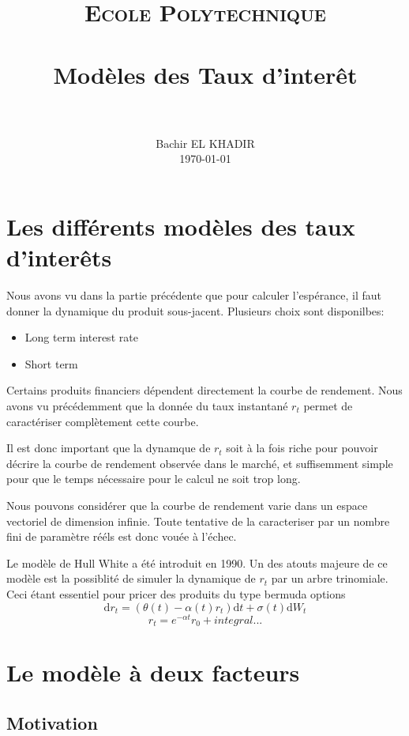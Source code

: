 \documentclass[paper=a4, fontsize=11pt]{scrartcl}
\title{
		\usefont{OT1}{bch}{b}{n}
		\normalfont \normalsize \textsc{Ecole Polytechnique} \\ [25pt]
		\horrule{0.5pt} \\[0.4cm]
		\huge Modèles des Taux d'interêt \\
		\horrule{2pt} \\[0.5cm]
}
\author{
		\normalfont \normalsize
                Bachir EL KHADIR\\[-3pt] \normalsize
                \today	
}
\date{}
\numberwithin{equation}{section}		%
\numberwithin{figure}{section}			%
\numberwithin{table}{section}				%
\theoremstyle{definition}
\begin{document}
\maketitle

\newpage
\tableofcontents

\newpage

\newpage
 
\newpage
 
\newpage
\section{Les différents modèles des taux d'interêts}

Nous avons vu dans la partie précédente que pour calculer l'espérance, il faut donner la dynamique du produit sous-jacent.
Plusieurs choix sont disponilbes:
\begin{itemize}
\item Long term interest rate
\item Short term
\end{itemize}

Certains produits financiers dépendent directement la courbe de rendement. Nous avons vu précédemment que la donnée du taux instantané $r_t$ permet de caractériser complètement cette courbe. 

Il est donc important que la dynamque de $r_t$ soit à la fois riche pour pouvoir décrire la courbe de rendement observée dans le marché, et suffisemment simple pour que le temps nécessaire pour le calcul ne soit trop long.

Nous pouvons considérer que la courbe de rendement varie dans un espace vectoriel de dimension infinie. Toute tentative de la caracteriser par un nombre fini de paramètre rééls est donc vouée à l'échec.

Le modèle de Hull White a été introduit en 1990.  Un des atouts majeure de ce modèle est la possiblité de simuler la dynamique de $r_t$ par un arbre trinomiale. Ceci étant essentiel pour pricer des produits du type bermuda options
$$ \mathrm{d}r_t =  (\theta(t) - \alpha(t) r_t) \mathrm{d}t + \sigma(t) \mathrm{d} W_t$$
$$ r_t = e^{-\alpha t} r_0 + integral ...$$


\newpage
\section{Le modèle à deux facteurs}
\subsection{Motivation}
\end{document}
